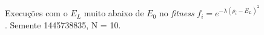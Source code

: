 \begin{figure}[htbp]
\begin{tabular}{@{}cc@{}}
		
  \end{tabular}
  \caption{Execuções com o $E_L$ muito abaixo de $E_0$ no \textit{fitness} $f_i = e^{-\lambda(\rho_i - E_L)^2}$. Semente 1445738835, N = 10.}
	\label{fig:variando_EL_muito_abaixo}
	\end{figure}